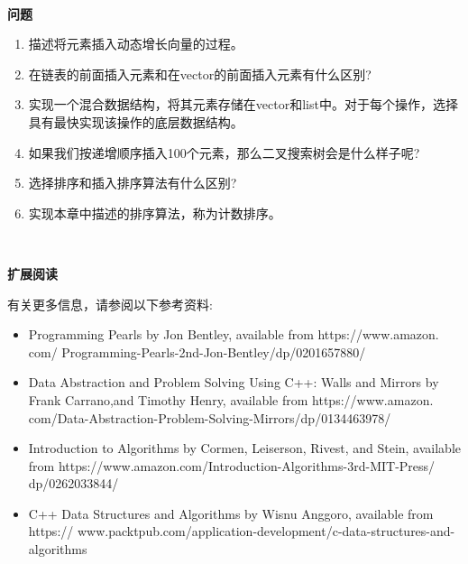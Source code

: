 \noindent\textbf{}\ \par
\textbf{问题} \ \par
\begin{enumerate}
	\item 描述将元素插入动态增长向量的过程。
	\item 在链表的前面插入元素和在vector的前面插入元素有什么区别?
	\item 实现一个混合数据结构，将其元素存储在vector和list中。对于每个操作，选择具有最快实现该操作的底层数据结构。
	\item 如果我们按递增顺序插入100个元素，那么二叉搜索树会是什么样子呢?
	\item 选择排序和插入排序算法有什么区别?
	\item 实现本章中描述的排序算法，称为计数排序。
\end{enumerate}

\noindent\textbf{}\ \par
\textbf{扩展阅读} \ \par
有关更多信息，请参阅以下参考资料: \par

\begin{itemize}
	\item Programming Pearls by Jon Bentley, available from  https:/​/​www.​amazon.​com/	Programming-​Pearls-​2nd-​Jon-​Bentley/​dp/​0201657880/​
	\item Data Abstraction and Problem Solving Using C++: Walls and Mirrors by Frank Carrano,and Timothy Henry, available from  https:/​/​www.​amazon.​com/​Data-Abstraction-​Problem-​Solving-​Mirrors/​dp/​0134463978/​
	\item Introduction to Algorithms by Cormen, Leiserson, Rivest, and Stein, available
	from https:/​/​www.​amazon.​com/​Introduction-​Algorithms-​3rd-​MIT-​Press/​dp/0262033844/​
	\item C++ Data Structures and Algorithms by Wisnu Anggoro, available from  https:/​/
	www.​packtpub.​com/​application-​development/​c-​data-​structures-​and-algorithms
\end{itemize}

\newpage







